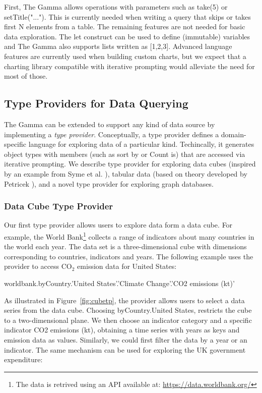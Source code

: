 \documentclass[manuscript,review,anonymous]{acmart}
\newcommand{\ikvd}[1]{{\fontfamily{zi4}\selectfont\small #1}}
\begin{document}
\noindent
First, The Gamma allows operations with parameters such as \ikvd{take(5)} or \ikvd{setTitle("...")}.
This is currently needed when writing a query that skips or takes first N elements from a table.
The remaining features are not needed for basic data exploration. The \ikvd{let} construct can be
used to define (immutable) variables and The Gamma also supports lists written as \ikvd{[1,2,3]}.
Advanced language features are currently used when building custom charts, but we expect that a
charting library compatible with iterative prompting would alleviate the need for most of those.


\subsection{Type Providers for Data Querying}
\label{sec:overview-tps}

The Gamma can be extended to support any kind of data source by implementing a \emph{type provider}.
Conceptually, a type provider defines a domain-specific language for exploring data of a particular
kind. Techincally, it generates object types with members (such as \ikvd{sort by} or \ikvd{Count is})
that are accessed via iterative prompting. We describe type provider for exploring data cubes
(inspired by an example from Syme et al. \cite{inforich}), tabular data (based on theory developed
by Petricek \cite{dotdriven}), and a novel type provider for exploring graph databases.

\subsubsection*{Data Cube Type Provider}
Our first type provider allows users to explore data form a data cube. For example, the World
Bank\footnote{The data is retrived using an API available at: \url{https://data.worldbank.org/}}
collects a range of indicators about many countries in the world each year. The data set is a
three-dimensional cube with dimensions corresponding to countries, indicators and years. The
following example uses the provider to access CO$_{2}$ emission data for United States:

\begin{thegamma}
worldbank.byCountry.'United States'.'Climate Change'.'CO2 emissions (kt)'
\end{thegamma}

\noindent
As illustrated in Figure~\ref{fig:cubetp}, the provider allows users to select a data series
from the data cube. Choosing \ikvd{byCountry.\textquotesingle United States\textquotesingle},
restricts the cube to a two-dimensional plane. We then choose an indicator category
and a specific indicator \ikvd{\textquotesingle CO2 emissions (kt)\textquotesingle}, obtaining
a time series with years as keys and emission data as values. Similarly, we could first filter the
data by a year or an indicator. The same mechanism can be used for exploring the UK government
expenditure:
\end{document}
